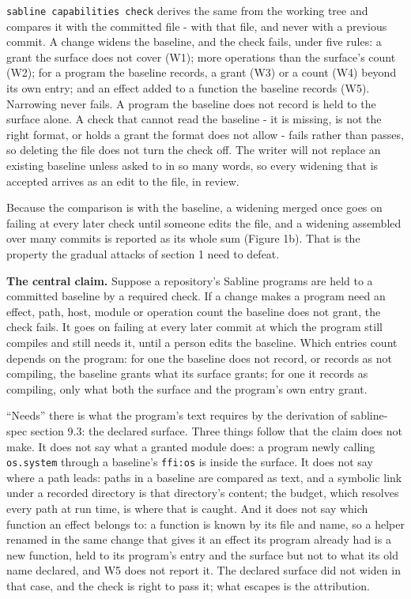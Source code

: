 \documentclass[
]{article}
\begin{document}
\texttt{sabline\ capabilities\ check} derives the same from the working
tree and compares it with the committed file - with that file, and never
with a previous commit. A change widens the baseline, and the check
fails, under five rules: a grant the surface does not cover (W1); more
operations than the surface's count (W2); for a program the baseline
records, a grant (W3) or a count (W4) beyond its own entry; and an
effect added to a function the baseline records (W5). Narrowing never
fails. A program the baseline does not record is held to the surface
alone. A check that cannot read the baseline - it is missing, is not the
right format, or holds a grant the format does not allow - fails rather
than passes, so deleting the file does not turn the check off. The
writer will not replace an existing baseline unless asked to in so many
words, so every widening that is accepted arrives as an edit to the
file, in review.

Because the comparison is with the baseline, a widening merged once goes
on failing at every later check until someone edits the file, and a
widening assembled over many commits is reported as its whole sum
(Figure 1b). That is the property the gradual attacks of section 1 need
to defeat.

\textbf{The central claim.} Suppose a repository's Sabline programs are
held to a committed baseline by a required check. If a change makes a
program need an effect, path, host, module or operation count the
baseline does not grant, the check fails. It goes on failing at every
later commit at which the program still compiles and still needs it,
until a person edits the baseline. Which entries count depends on the
program: for one the baseline does not record, or records as not
compiling, the baseline grants what its surface grants; for one it
records as compiling, only what both the surface and the program's own
entry grant.

``Needs'' there is what the program's text requires by the derivation of
sabline-spec section 9.3: the declared surface. Three things follow that
the claim does not make. It does not say what a granted module does: a
program newly calling \texttt{os.system} through a baseline's
\texttt{ffi:os} is inside the surface. It does not say where a path
leads: paths in a baseline are compared as text, and a symbolic link
under a recorded directory is that directory's content; the budget,
which resolves every path at run time, is where that is caught. And it
does not say which function an effect belongs to: a function is known by
its file and name, so a helper renamed in the same change that gives it
an effect its program already had is a new function, held to its
program's entry and the surface but not to what its old name declared,
and W5 does not report it. The declared surface did not widen in that
case, and the check is right to pass it; what escapes is the
attribution.
\end{document}
